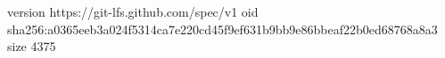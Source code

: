 version https://git-lfs.github.com/spec/v1
oid sha256:a0365eeb3a024f5314ca7e220cd45f9ef631b9bb9e86bbeaf22b0ed68768a8a3
size 4375
